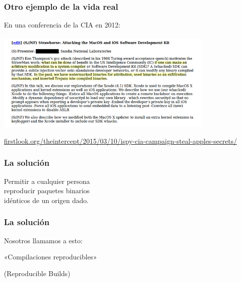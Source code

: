 \documentclass[14pt,aspectratio=169]{beamer}
\begin{document}
\begin{frame}[fragile]
\frametitle{Otro ejemplo de la vida real}

En una conferencia de la CIA en 2012:

\begin{center}
\includegraphics[width=0.8\textwidth]{images/strawhorse.png}

{\footnotesize 
\url{firstlook.org/theintercept/2015/03/10/ispy-cia-campaign-steal-apples-secrets/}
}
\end{center}

\end{frame}

\begin{frame}
\frametitle{La solución}

\begin{center}
\Large
Permitir a cualquier persona\\
reproducir paquetes binarios\\
idénticos de un origen dado.
\end{center}

\end{frame}

\begin{frame}
\frametitle{La solución}

\begin{center}
Nosotros llamamos a esto:

\Huge
«Compilaciones reproducibles»
\begin{huge}
(Reproducible Builds)
\end{huge}
\end{center}

\end{frame}
\end{document}

